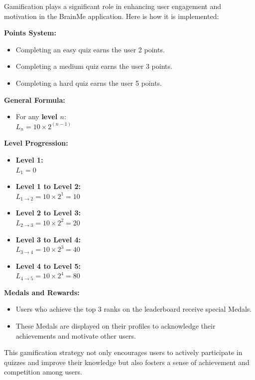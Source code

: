 Gamification plays a significant role in enhancing user engagement and motivation in the BrainMe application. Here is how it is implemented:

\textbf{Points System:}
\begin{itemize}
    \item Completing an easy quiz earns the user 2 points.
    \item Completing a medium quiz earns the user 3 points.
    \item Completing a hard quiz earns the user 5 points.
\end{itemize}

\textbf{General Formula: }

\begin{itemize}
    \item For any \textbf{level $n$}: \\
    $L_n = 10 \times 2^{(n-1)}$
\end{itemize}

\textbf{Level Progression:}
\begin{itemize}
    \item \textbf{Level 1:} \\
    $L_1 = 0$
    \item \textbf{Level 1 to Level 2:} \\
    $L_{1\rightarrow2} = 10 \times 2^1 = 10$
    \item \textbf{Level 2 to Level 3:} \\
    $L_{2\rightarrow3} = 10 \times 2^2 = 20$
    \item \textbf{Level 3 to Level 4:} \\
    $L_{3\rightarrow4} = 10 \times 2^3 = 40$
    \item \textbf{Level 4 to Level 5:} \\
    $L_{4\rightarrow5} = 10 \times 2^4 = 80$
\end{itemize}


\textbf{Medals and Rewards:}
\begin{itemize}
    \item Users who achieve the top 3 ranks on the leaderboard receive special Medals.
    \item These Medals are displayed on their profiles to acknowledge their achievements and motivate other users.
\end{itemize}

This gamification strategy not only encourages users to actively participate in quizzes and improve their knowledge but also fosters a sense of achievement and competition among users.
